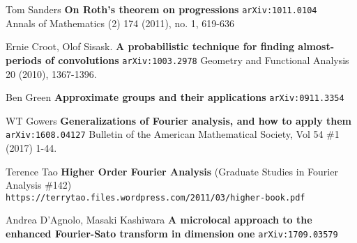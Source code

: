 \documentclass[12pt]{article}
\begin{document}
\begin{thebibliography}{}

\item Tom Sanders \textbf{On Roth's theorem on progressions} \texttt{arXiv:1011.0104} \\
Annals of Mathematics (2) 174 (2011), no. 1, 619-636

\item Ernie Croot, Olof Sisask. \textbf{A probabilistic technique for finding almost-periods of convolutions} \texttt{arXiv:1003.2978} Geometry and Functional Analysis 20 (2010), 1367-1396.

\item Ben Green 
\textbf{Approximate groups and their applications} \texttt{arXiv:0911.3354} 
\item WT Gowers \textbf{Generalizations of Fourier analysis, and how to apply them} \\
\texttt{arXiv:1608.04127} Bulletin of the American Mathematical Society, Vol 54 \#1 (2017) 1-44.
\item Terence Tao \textbf{Higher Order Fourier Analysis} (Graduate Studies in Fourier Analysis \#142) \\
\texttt{https://terrytao.files.wordpress.com/2011/03/higher-book.pdf} \\
\item Andrea D'Agnolo, Masaki Kashiwara \textbf{A microlocal approach to the enhanced Fourier-Sato transform in dimension one} \texttt{arXiv:1709.03579
}

\end{thebibliography}
\end{document}
